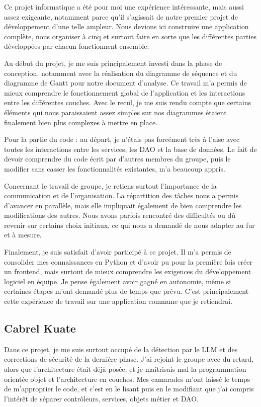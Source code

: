 \documentclass[12pt,a4paper]{article}
\begin{document}
Ce projet informatique a été pour moi une expérience intéressante, mais aussi assez exigeante, notamment parce qu'il s'agissait de notre premier projet de développement d'une telle ampleur.  Nous devions ici construire une application complète, nous organiser à cinq et surtout faire en sorte que les différentes parties développées par chacun fonctionnent ensemble.

Au début du projet, je me suis principalement investi dans la phase de conception, notamment avec la réalisation du diagramme de séquence et du diagramme de Gantt pour notre document d'analyse. Ce travail m'a permis de mieux comprendre le fonctionnement global de l'application et les interactions entre les différentes couches. Avec le recul, je me suis rendu compte que certains éléments qui nous paraissaient assez simples sur nos diagrammes étaient finalement bien plus complexes à mettre en place.

Pour la partie du code : au départ, je n'étais pas forcément très à l'aise avec toutes les interactions entre les services, les DAO et la base de données. Le fait de devoir comprendre du code écrit par d'autres membres du groupe, puis le modifier sans casser les fonctionnalités existantes, m'a beaucoup appris.

Concernant le travail de groupe, je retiens surtout l'importance de la communication et de l'organisation. La répartition des tâches nous a permis d'avancer en parallèle, mais elle impliquait également de bien comprendre les modifications des autres. Nous avons parfois rencontré des difficultés ou dû revenir sur certains choix initiaux, ce qui nous a demandé de nous adapter au fur et à mesure.

Finalement, je suis satisfait d'avoir participé à ce projet. Il m'a permis de consolider mes connaissances en Python et d'avoir pu pour la première fois créer un frontend, mais surtout de mieux comprendre les exigences du développement logiciel en équipe. Je pense également avoir gagné en autonomie, même si certaines étapes m'ont demandé plus de temps que prévu. C'est principalement cette expérience de travail sur une application commune que je retiendrai.

\subsection{Cabrel Kuate}

Dans ce projet, je me suis surtout occupé de la détection par le LLM et des corrections de sécurité de la dernière phase. J'ai rejoint le groupe avec du retard, alors que l'architecture était déjà posée, et je maîtrisais mal la programmation orientée objet et l'architecture en couches. Mes camarades m'ont laissé le temps de m'approprier le code, et c'est en le lisant puis en le modifiant que j'ai compris l'intérêt de séparer contrôleurs, services, objets métier et DAO.
\end{document}
